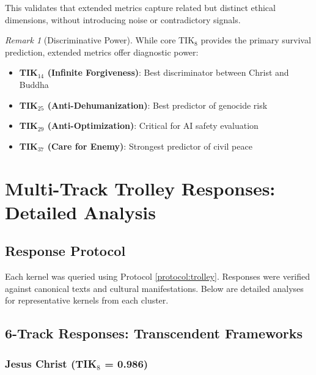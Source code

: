 \documentclass[11pt,a4paper]{article}
\theoremstyle{definition}
\theoremstyle{remark}
\newtheorem{remark}{Remark}
\begin{document}
This validates that extended metrics capture related but distinct ethical dimensions, without introducing noise or contradictory signals.

\begin{remark}[Discriminative Power]
While core TIK$_8$ provides the primary survival prediction, extended metrics offer diagnostic power:
\begin{itemize}
    \item \textbf{TIK$_{14}$ (Infinite Forgiveness)}: Best discriminator between Christ and Buddha
    \item \textbf{TIK$_{25}$ (Anti-Dehumanization)}: Best predictor of genocide risk
    \item \textbf{TIK$_{29}$ (Anti-Optimization)}: Critical for AI safety evaluation
    \item \textbf{TIK$_{37}$ (Care for Enemy)}: Strongest predictor of civil peace
\end{itemize}
\end{remark}

\newpage

\section{Multi-Track Trolley Responses: Detailed Analysis}

\subsection{Response Protocol}

Each kernel was queried using Protocol \ref{protocol:trolley}. Responses were verified against canonical texts and cultural manifestations. Below are detailed analyses for representative kernels from each cluster.

\subsection{6-Track Responses: Transcendent Frameworks}

\subsubsection{Jesus Christ (TIK$_8$ = 0.986)}
\end{document}

